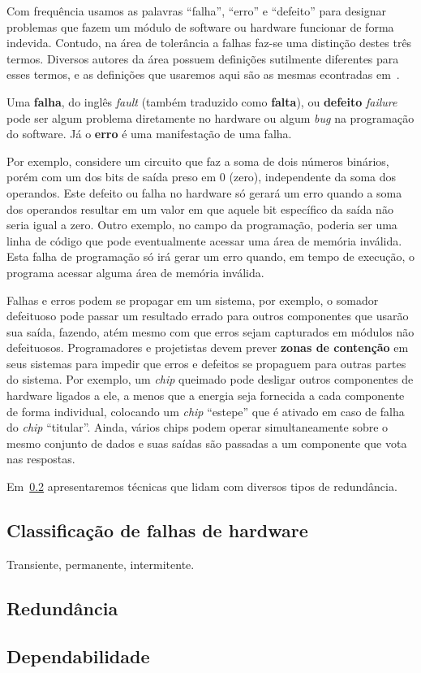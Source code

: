 Com frequência usamos as palavras ``falha'', ``erro'' e ``defeito'' para designar problemas que fazem um módulo de software ou hardware funcionar de forma indevida. Contudo, na área de tolerância a falhas faz-se uma distinção destes três termos. Diversos autores da área possuem definições sutilmente diferentes para esses termos, e as definições que usaremos aqui são as mesmas econtradas em~\cite{koren2007fault}.

Uma \textbf{falha}, do inglês \emph{fault} (também traduzido como \textbf{falta}), ou \textbf{defeito} \emph{failure} pode ser algum problema diretamente no hardware ou algum \emph{bug} na programação do software. Já o \textbf{erro} é uma manifestação de uma falha.

Por exemplo, considere um circuito que faz a soma de dois números binários, porém com um dos bits de saída preso em $0$ (zero), independente da soma dos operandos. Este defeito ou falha no hardware só gerará um erro quando a soma dos operandos resultar em um valor em que aquele bit específico da saída não seria igual a zero. Outro exemplo, no campo da programação, poderia ser uma linha de código que pode eventualmente acessar uma área de memória inválida. Esta falha de programação só irá gerar um erro quando, em tempo de execução, o programa acessar alguma área de memória inválida.

Falhas e erros podem se propagar em um sistema, por exemplo, o somador defeituoso pode passar um resultado errado para outros componentes que usarão sua saída, fazendo, atém mesmo com que erros sejam capturados em módulos não defeituosos. Programadores e projetistas devem prever \textbf{zonas de contenção} em seus sistemas para impedir que erros e defeitos se propaguem para outras partes do sistema. Por exemplo, um \emph{chip} queimado pode desligar outros componentes de hardware ligados a ele, a menos que a energia seja fornecida a cada componente de forma individual, colocando um \emph{chip} ``estepe'' que é ativado em caso de falha do \emph{chip} ``titular''. Ainda, vários chips podem operar simultaneamente sobre o mesmo conjunto de dados e suas saídas são passadas a um componente que vota nas respostas.

Em~\ref{sub:redundancia} apresentaremos técnicas que lidam com diversos tipos de redundância.


\subsection{Classificação de falhas de hardware} %
\label{sub:classificacao}

Transiente, permanente, intermitente.



\subsection{Redundância} %
\label{sub:redundancia}


\subsection{Dependabilidade} %
\label{sub:dependabilidade}


